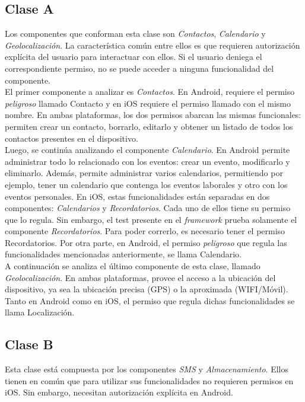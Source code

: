 \subsection{Clase A}
Los componentes que conforman esta clase son \emph{Contactos}, \emph{Calendario} y \emph{Geolocalización}. La característica común entre ellos es que requieren autorización explícita del usuario para interactuar con ellos. Si el usuario deniega el correspondiente permiso, no se puede acceder a ninguna funcionalidad del componente.\\
El primer componente a analizar es \emph{Contactos}. En Android, requiere el permiso \textit{peligroso} llamado Contacto y en iOS requiere el permiso llamado con el mismo nombre. En ambas plataformas, los dos permisos abarcan las mismas funcionales: permiten crear un contacto, borrarlo, editarlo y obtener un listado de todos los contactos presentes en el dispositivo.\\

Luego, se continúa analizando el componente \emph{Calendario}. En Android permite administrar todo lo relacionado con los eventos: crear un evento, modificarlo y eliminarlo. Además, permite administrar varios calendarios, permitiendo por ejemplo, tener un calendario que contenga los eventos laborales y otro con los eventos personales. En iOS, estas funcionalidades están separadas en dos componentes: \emph{Calendarios} y \emph{Recordatorios}. Cada uno de ellos tiene su permiso que lo regula. Sin embargo, el test presente en el \textit{framework} prueba solamente el componente \emph{Recordatorios}. Para poder correrlo, es necesario tener el permiso Recordatorios. Por otra parte, en Android, el permiso \textit{peligroso} que regula las funcionalidades mencionadas anteriormente, se llama Calendario.\\

A continuación se analiza el último componente de esta clase, llamado \emph{Geolocalización}. En ambas plataformas, provee el acceso a la ubicación del dispositivo, ya sea la ubicación precisa (GPS) o la aproximada (WIFI/Móvil). Tanto en Android como en iOS, el permiso que regula dichas funcionalidades se llama Localización.
\subsection{Clase B}
Esta clase está compuesta por los componentes \emph{SMS} y \emph{Almacenamiento}. Ellos tienen en común que para utilizar sus funcionalidades no requieren permisos en iOS. Sin embargo, necesitan autorización explícita en Android.\\

